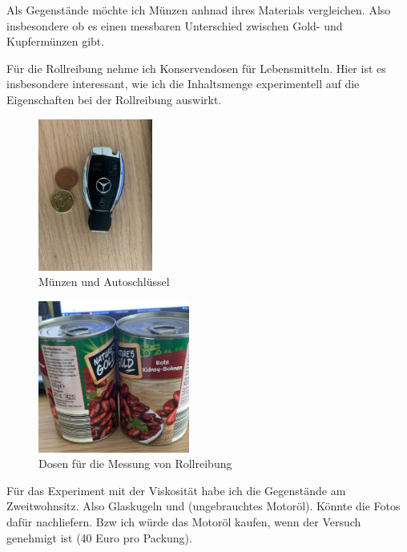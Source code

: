 \documentclass{article}
\begin{document}
Als Gegenstände möchte ich Münzen anhnad ihres Materials vergleichen. Also insbesondere ob es einen messbaren Unterschied zwischen Gold- und Kupfermünzen gibt.

Für die Rollreibung nehme ich Konservendosen für Lebensmitteln. Hier ist es insbesondere interessant, wie ich die Inhaltsmenge experimentell auf die Eigenschaften bei der Rollreibung auswirkt. 


\begin{figure}[H]
\includegraphics[height=5cm]{schlussel_muenzen.jpg}
\caption{Münzen und Autoschlüssel}
\end{figure}

\begin{figure}[H]
\includegraphics[height=5cm]{futter.jpg}
\caption{Dosen für die Messung von Rollreibung}

\end{figure}


Für das Experiment mit der Viskosität habe ich die Gegenstände am Zweitwohnsitz. Also Glaskugeln und (ungebrauchtes Motoröl). Könnte die Fotos dafür nachliefern. Bzw ich würde das Motoröl kaufen, wenn der Versuch genehmigt ist (40 Euro pro Packung).
\end{document}
